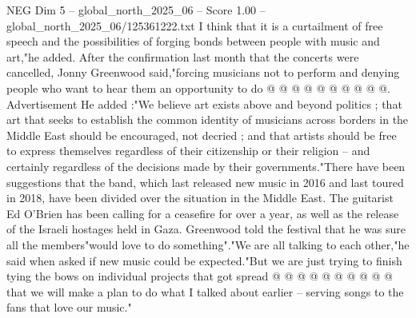 \begin{textsample}{NEG Dim 5 – global\_north\_2025\_06 – Score 1.00 – global\_north\_2025\_06/125361222.txt}
I think that it is a curtailment of free speech and the possibilities of forging bonds between people with music and art,"he added.
After the confirmation last month that the concerts were cancelled, Jonny Greenwood said,"forcing musicians not to perform and denying people who want to hear them an opportunity to do @ @ @ @ @ @ @ @ @ @.
Advertisement He added :"We believe art exists above and beyond politics ; that art that seeks to establish the common identity of musicians across borders in the Middle East should be encouraged, not decried ; and that artists should be free to express themselves regardless of their citizenship or their religion -- and certainly regardless of the decisions made by their governments."There have been suggestions that the band, which last released new music in 2016 and last toured in 2018, have been divided over the situation in the Middle East.
The guitarist Ed O'Brien has been calling for a ceasefire for over a year, as well as the release of the Israeli hostages held in Gaza.
Greenwood told the festival that he was sure all the members"would love to do something"."We are all talking to each other,"he said when asked if new music could be expected."But we are just trying to finish tying the bows on individual projects that got spread @ @ @ @ @ @ @ @ @ @ that we will make a plan to do what I talked about earlier -- serving songs to the fans that love our music."

\end{textsample}
